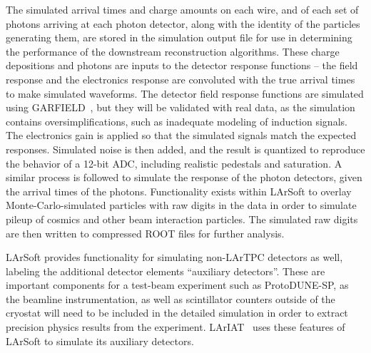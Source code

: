 The simulated arrival times and charge amounts on each wire, and of
each set of photons arriving at each photon detector, along with the
identity of the particles generating them, are stored in the
simulation output file for use in determining the performance of the
downstream reconstruction algorithms.  These charge depositions and
photons are inputs to the detector response functions -- the field
response and the electronics response are convoluted with the true
arrival times to make simulated waveforms.  The detector field
response functions are simulated using GARFIELD~\cite{garfield}, but
they will be validated with real data, as the simulation contains
oversimplifications, such as inadequate modeling of induction signals.  
The electronics gain is applied so that the
simulated signals match the expected responses.  Simulated noise is
then added, and the result is quantized to reproduce the behavior of a
12-bit ADC, including realistic pedestals and saturation.  A similar
process is followed to simulate the response of the photon detectors,
given the arrival times of the photons.  Functionality exists within
LArSoft to overlay Monte-Carlo-simulated particles with raw digits in
the data in order to simulate pileup of cosmics and other beam
interaction particles. The simulated raw digits are then written to
compressed ROOT files for further analysis.

LArSoft provides functionality for simulating non-LArTPC detectors as
well, labeling the additional detector elements ``auxiliary
detectors''.  These are important components for a test-beam
experiment such as ProtoDUNE-SP, as the beamline instrumentation, as
well as scintillator counters outside of the cryostat will need to be
included in the detailed simulation in order to extract precision
physics results from the experiment.  LArIAT~\cite{lariat} uses these
features of LArSoft to simulate its auxiliary detectors.
